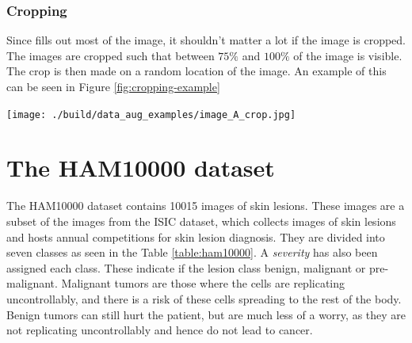 \subsubsection{Cropping}
Since fills out most of the image,
it shouldn't matter a lot if the image is cropped.
The images are cropped such that between $75\%$ and $100\%$ of the image is visible.
The crop is then made on a random location of the image.
An example of this can be seen in Figure \ref{fig:cropping-example}

\begin{center}
    \texttt{[image: ./build/data\_aug\_examples/image\_A\_crop.jpg]}
    \label{fig:cropping-example}
\end{center}



\section{The HAM10000 dataset}
The HAM10000 dataset contains 10015 images of skin lesions.
These images are a subset of the images from the ISIC dataset\cite{ISIC_Dataset_2018},
which collects images of skin lesions and hosts annual competitions for skin lesion diagnosis.
They are divided into seven classes as seen in the Table \ref{table:ham10000}.
A \textit{severity} has also been assigned each class.
These indicate if the lesion class benign, malignant or pre-malignant.
Malignant tumors are those where the cells are replicating uncontrollably,
and there is a risk of these cells spreading to the rest of the body.
Benign tumors can still hurt the patient, but are much less of a worry,
as they are not replicating uncontrollably and hence do not lead to cancer.


